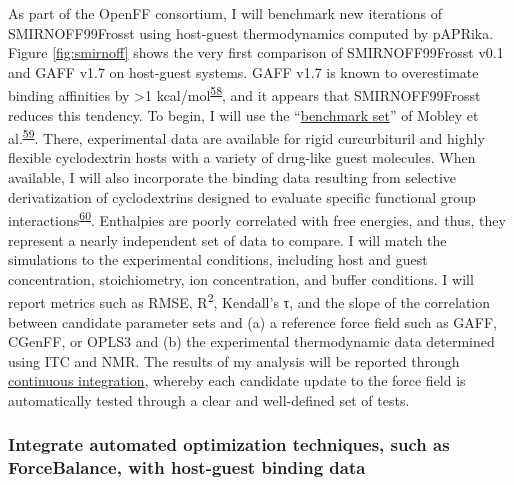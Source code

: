 \documentclass[11pt,notitlepage]{article}
\begin{document}
As part of the OpenFF consortium, I will benchmark new iterations of
SMIRNOFF99Frosst using host-guest thermodynamics computed by pAPRika.
Figure \ref{fig:smirnoff} shows the very first comparison of
SMIRNOFF99Frosst v0.1 and GAFF v1.7 on host-guest systems. GAFF v1.7 is
known to overestimate binding affinities by \textgreater{}1
kcal/mol\textsuperscript{\protect\hyperlink{ref-HVgz5rZq}{58}}, and it
appears that SMIRNOFF99Frosst reduces this tendency. To begin, I will
use the ``\href{https://escholarship.org/uc/item/9p37m6bq}{benchmark
set}'' of Mobley et
al.\textsuperscript{\protect\hyperlink{ref-12BD3oHp4}{59}}. There,
experimental data are available for rigid curcurbituril and highly
flexible cyclodextrin hosts with a variety of drug-like guest molecules.
When available, I will also incorporate the binding data resulting from
selective derivatization of cyclodextrins designed to evaluate specific
functional group
interactions\textsuperscript{\protect\hyperlink{ref-13gqBX78S}{60}}.
Enthalpies are poorly correlated with free energies, and thus, they
represent a nearly independent set of data to compare. I will match the
simulations to the experimental conditions, including host and guest
concentration, stoichiometry, ion concentration, and buffer conditions.
I will report metrics such as RMSE, R\textsuperscript{2}, Kendall's τ,
and the slope of the correlation between candidate parameter sets and
(a) a reference force field such as GAFF, CGenFF, or OPLS3 and (b) the
experimental thermodynamic data determined using ITC and NMR. The
results of my analysis will be reported through
\href{https://travis-ci.org/openforcefield/openforcefield?branch=master}{continuous
integration}, whereby each candidate update to the force field is
automatically tested through a clear and well-defined set of tests.

\hypertarget{integrate-automated-optimization-techniques-such-as-forcebalance-with-host-guest-binding-data}{%
\subsubsection{Integrate automated optimization techniques, such as
ForceBalance, with host-guest binding
data}\label{integrate-automated-optimization-techniques-such-as-forcebalance-with-host-guest-binding-data}}
\end{document}
